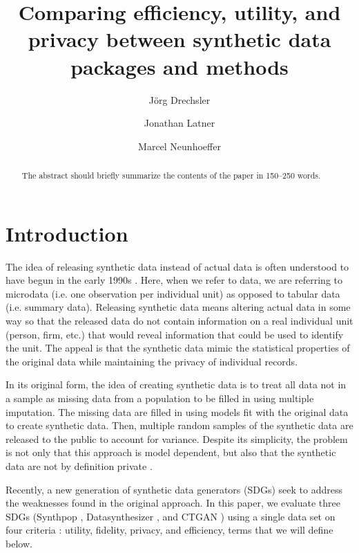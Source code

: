 \documentclass[runningheads]{llncs}
\title{Comparing efficiency, utility, and privacy between synthetic data packages and methods}
\author{Jörg Drechsler\inst{1 (\text{\Letter})} \and
Jonathan Latner\inst{1 \orcidlink{0000-0002-1825-0097}} \and
Marcel Neunhoeffer\inst{1 \orcidlink{0000-0002-9137-5785}}}
\institute{Institute for Employment Research, Nuremberg, Germany
\email{\{joerg.drechsler,jonathan.latner,marcel.neunhoeffer\}@iab.de}}
\begin{document}
\maketitle              %

\begin{abstract}
The abstract should briefly summarize the contents of the paper in
150--250 words.

\end{abstract}


\clearpage

\section{Introduction}

The idea of releasing synthetic data instead of actual data is often understood to have begun in the early 1990s \cite{rubin1993statistical,little1993statistical}.  Here, when we refer to data, we are referring to microdata (i.e. one observation per individual unit) as opposed to tabular data (i.e. summary data).  Releasing synthetic data means altering actual data in some way so that the released data do not contain information on a real individual unit (person, firm, etc.) that would reveal information that could be used to identify the unit.  The appeal is that the synthetic data mimic the statistical properties of the original data while maintaining the privacy of individual records.

In its original form, the idea of creating synthetic data is to treat all data not in a sample as missing data from a population to be filled in using multiple imputation.  The missing data are filled in using models fit with the original data to create synthetic data.  Then, multiple random samples of the synthetic data are released to the public to account for variance.  Despite its simplicity, the problem is not only that this approach is model dependent, but also that the synthetic data are not by definition private \cite{reiter2009estimating}.  

Recently, a new generation of synthetic data generators (SDGs) seek to address the weaknesses found in the original approach.  In this paper, we evaluate three SDGs (Synthpop \cite{nowok2016synthpop}, Datasynthesizer \cite{ping2017datasynthesizer}, and CTGAN \cite{ctgan}) using a single data set on four criteria \cite{jordon2022synthetic}: utility, fidelity, privacy, and efficiency, terms that we will define below.  
\end{document}
